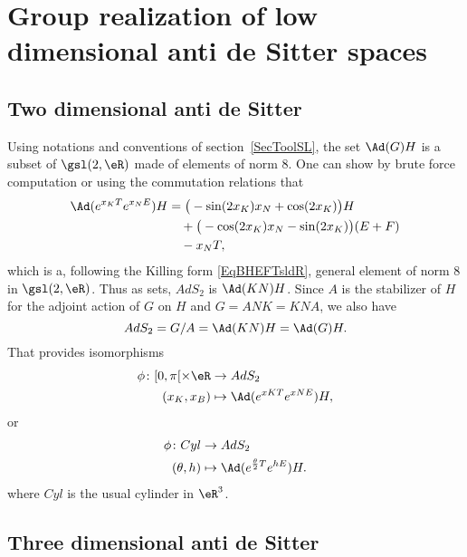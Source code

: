 \section[Low dimensional anti de Sitter spaces]{Group realization of low dimensional anti de Sitter spaces}

\subsection{Two dimensional anti de Sitter}		\label{SubsecTwoDimAdSAdGH}

Using notations and conventions of section~\ref{SecToolSL}, the set $\Ad(G)H$ is a subset of $\gsl(2,\eR)$ made of elements of norm $8$. One can show by brute force computation or using the commutation relations that
\[
	\begin{split}
		\Ad( e^{x_KT} e^{x_NE})H&=\big( -\sin(2x_K)x_N+\cos(2x_K) \big)H\\
		&\quad+\big( -\cos(2x_K)x_N-\sin(2x_K) \big)(E+F)\\
		&\quad-x_NT,
	\end{split}
\]
which is a, following the Killing form \eqref{EqBHEFTsldR},  general element of norm $8$ in $\gsl(2,\eR)$. Thus as sets, $AdS_2$ is $\Ad(KN)H$.  Since $A$ is the stabilizer of $H$ for the adjoint action of $G$ on $H$ and $G=ANK=KNA$, we also have
\[
	AdS_2=G/A=\Ad(KN)H=\Ad(G)H.
\]
That provides isomorphisms
\begin{equation}
	\begin{aligned}
		\phi\colon [0,\pi[\times\eR & \to AdS_2                        \\
		(x_K,x_B)                   & \mapsto \Ad( e^{xK T} e^{xNE})H,
	\end{aligned}
\end{equation}
or
\begin{equation}	 \label{EqCylAdSDeux}
	\begin{aligned}
		\phi\colon Cyl & \to AdS_2                                        \\
		(\theta,h)     & \mapsto \Ad( e^{\frac{ \theta }{ 2 }T} e^{hE})H.
	\end{aligned}
\end{equation}
where $Cyl$ is the usual cylinder in $\eR^3$.

\subsection{Three dimensional anti de Sitter}		\label{SubsecGpAdsDeux}

